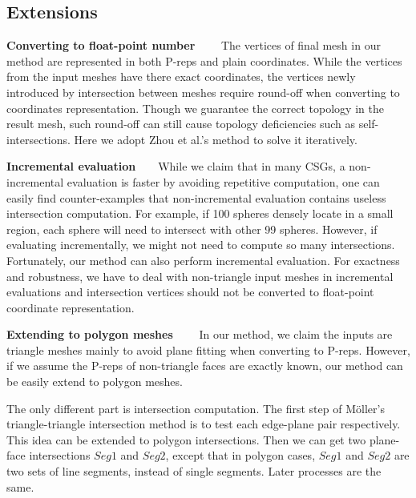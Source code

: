 \documentclass[10pt,journal,compsoc]{IEEEtran}
\begin{document}
\fi

\subsection{Extensions}

\vspace{0.5em}
\noindent\textbf{Converting to float-point number}~~~~
The vertices of final mesh in our method are represented in both P-reps and plain coordinates. While the vertices from the input meshes have there exact coordinates, the vertices newly introduced by intersection between meshes require round-off when converting to coordinates representation. Though we guarantee the correct topology in the result mesh, such round-off can still cause topology deficiencies such as self-intersections. Here we adopt Zhou et al.'s method \cite{zhou2016mesh} to solve it iteratively.

\vspace{0.5em}
\noindent\textbf{Incremental evaluation}~~~~While we claim that in many CSGs, a non-incremental evaluation is faster by avoiding repetitive computation, one can easily find counter-examples that non-incremental evaluation contains useless intersection computation. For example, if 100 spheres densely locate in a small region, each sphere will need to intersect with other 99 spheres. However, if evaluating incrementally, we might not need to compute so many intersections. Fortunately, our method can also perform incremental evaluation. For exactness and robustness, we have to deal with non-triangle input meshes in incremental evaluations and intersection vertices should not be converted to float-point coordinate representation.


\vspace{0.5em}
\noindent\textbf{Extending to polygon meshes}~~~~
In our method, we claim the inputs are triangle meshes mainly to avoid plane fitting when converting to P-reps. However, if we assume the P-reps of non-triangle faces are exactly known, our method can be easily extend to polygon meshes.


\vspace{0.5em}\noindent The only different part is intersection computation. The first step of M\"{o}ller's triangle-triangle intersection method is to test each edge-plane pair respectively. This idea can be extended to polygon intersections. Then we can get two plane-face intersections $Seg1$ and $Seg2$, except that in polygon cases, $Seg1$ and $Seg2$ are two sets of line segments, instead of single segments. Later processes are the same.
\end{document}

